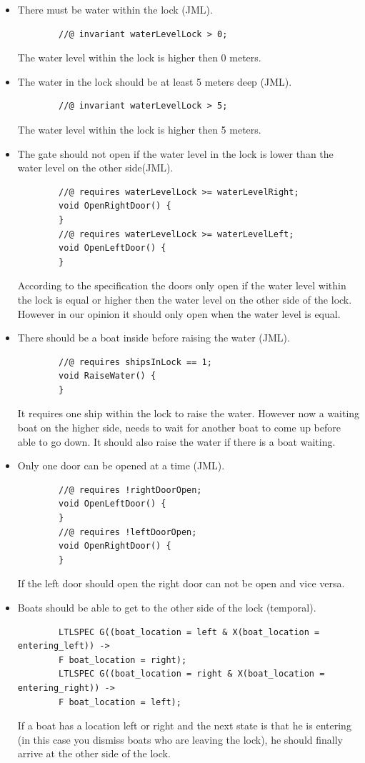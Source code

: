\documentclass[a4paper]{article}
\begin{document}
	\begin{itemize}
		\item There must be water within the lock (JML).
		\begin{lstlisting}
		//@ invariant waterLevelLock > 0;
		\end{lstlisting}
		The water level within the lock is higher then 0 meters.
		
		\item The water in the lock should be at least 5 meters deep (JML).
		\begin{lstlisting}
		//@ invariant waterLevelLock > 5;
		\end{lstlisting}
		The water level within the lock is higher then 5 meters.
		
		\item The gate should not open if the water level in the lock is lower than the water level on the other side(JML).
		\begin{lstlisting}
		//@ requires waterLevelLock >= waterLevelRight;
		void OpenRightDoor() {
		}
		//@ requires waterLevelLock >= waterLevelLeft;
		void OpenLeftDoor() {
		}
		\end{lstlisting}
		According to the specification the doors only open if the water level within the lock is equal or higher then the water level on the other side of the lock. However in our opinion it should only open when the water level is equal.
		
		\item There should be a boat inside before raising the water (JML).
		\begin{lstlisting}
		//@ requires shipsInLock == 1;
		void RaiseWater() {
		}
		\end{lstlisting}
		It requires one ship within the lock to raise the water. However now a waiting boat on the higher side, needs to wait for another boat to come up before able to go down. It should also raise the water if there is a boat waiting.
		
		\item Only one door can be opened at a time (JML).
		\begin{lstlisting}
		//@ requires !rightDoorOpen;
		void OpenLeftDoor() {
		}
		//@ requires !leftDoorOpen;
		void OpenRightDoor() {
		}	
		\end{lstlisting}
		If the left door should open the right door can not be open and vice versa.
		
		\item Boats should be able to get to the other side of the lock (temporal).
		\begin{lstlisting}
		LTLSPEC G((boat_location = left & X(boat_location = entering_left)) ->
		F boat_location = right);
		LTLSPEC G((boat_location = right & X(boat_location = entering_right)) ->
		F boat_location = left);
		\end{lstlisting}
		If a boat has a location left or right and the next state is that he is entering (in this case you dismiss boats who are leaving the lock), he should finally arrive at the other side of the lock. 
		

\end{itemize}
\end{document}
